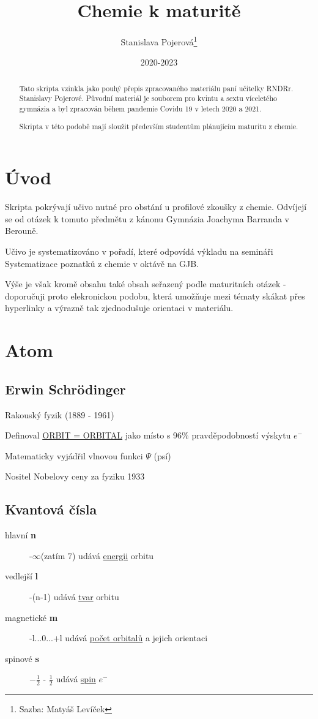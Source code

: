 \documentclass{article}
\title{Chemie k maturitě}
\author{Stanislava Pojerová\thanks{Sazba: Matyáš Levíček}}
\date{2020-2023}
\begin{document}
    \maketitle

    \begin{abstract}
        Tato skripta vzinkla jako pouhý přepis zpracovaného materiálu paní učitelky RNDRr. Stanislavy Pojerové. Původní materiál je souborem pro kvintu a sextu víceletého gymnázia a byl zpracován během pandemie Covidu 19 v letech 2020 a 2021.
        
        Skripta v této podobě mají sloužit především studentům plánujícím maturitu z chemie. 
    \end{abstract}

    \newpage
    \tableofcontents
    \newpage
    
    \section{Úvod}
        Skripta pokrývají učivo nutné pro obstání u profilové zkoušky z chemie. Odvíjejí se od otázek k tomuto předmětu z kánonu Gymnázia Joachyma Barranda v Berouně.

        Učivo je systematizováno v pořadí, které odpovídá výkladu na semináři Systematizace poznatků z chemie v oktávě na GJB. 

        Výše je však kromě obsahu také obsah seřazený podle maturitních otázek - doporučuji proto elekronickou podobu, která umožňuje mezi tématy skákat přes hyperlinky a výrazně tak zjednodušuje orientaci v materiálu.
    \newpage
    
\setlength{\parindent}{0px}
\section{Atom}
\subsection{Erwin Schrödinger}
Rakouský fyzik (1889 - 1961)

Definoval \underline{ORBIT = ORBITAL} jako místo s 96\% pravděpodobností výskytu $e^-$

Matematicky vyjádřil vlnovou funkci $\Psi$ (psí)

Nositel Nobelovy ceny za fyziku 1933

\TabPositions{0em, 12em, 25em}
\subsection{Kvantová čísla}
    \begin{description}
        \item[hlavní \textbf{n}] -$\infty$(zatím 7) \tab udává \underline{energii} orbitu
        \item[vedlejší \textbf{l}] -(n-1) \tab udává \underline{tvar} orbitu
        \item[magnetické \textbf{m}] \tab -l...0...+l \tab udává \underline{počet orbitalů} a jejich orientaci
        \item[spinové \textbf{s}] \tab $-\frac{1}{2}$ - $\frac{1}{2}$ \tab udává \underline{spin} $e^-$
    \end{description}
\end{document}
